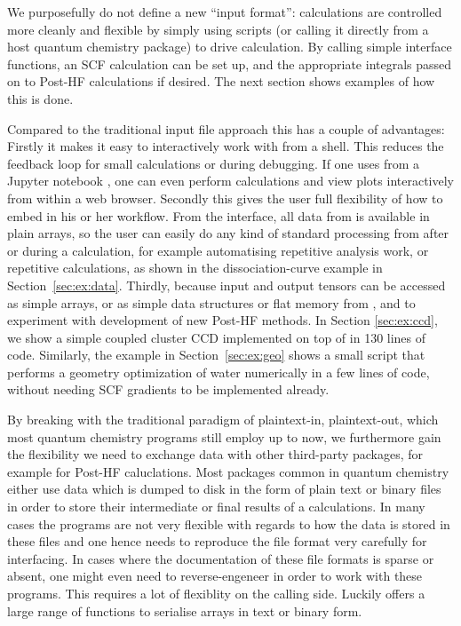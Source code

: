 We purposefully do not define a new ``input format'': calculations are 
controlled more cleanly and flexible by simply using
\python scripts (or calling it directly from a host quantum 
chemistry package) to drive calculation.
By calling simple interface functions, an SCF calculation can be set
up, and the appropriate integrals passed on to Post-HF calculations
if desired. The next section shows examples of how this is done.

Compared to the traditional input file approach this has
a couple of advantages:
%
Firstly it makes it easy to interactively work with \molsturm
from a shell. This reduces the feedback loop for small calculations
or during debugging.  If one uses \molsturm from a Jupyter notebook \cite{Jupyter},
one can even perform calculations and view plots interactively from within a web browser.
%
Secondly this gives the user full flexibility
of how to embed \molsturm in his or her workflow.
From the \python interface, all data from \molsturm is available
in plain \numpy arrays, so the user can easily do
any kind of standard processing from \python
after or during a calculation, for example
automatising repetitive analysis work, or repetitive calculations,
as shown in the dissociation-curve example in Section~\ref{sec:ex:data}.
%
Thirdly, because input and output tensors can be accessed as simple
\numpy arrays, or as simple data structures or flat memory from \cpp,
and to experiment with development of new Post-HF methods.
In Section \ref{sec:ex:ccd}, we show a simple coupled cluster CCD
implemented on top of \molsturm in 130 lines of \numpy code.
Similarly, the example in Section~\ref{sec:ex:geo} shows a small
\python script that performs a geometry optimization of water 
numerically in a few lines of code, without needing SCF gradients 
to be implemented already.

By breaking with the traditional paradigm of plaintext-in, plaintext-out,
which most quantum chemistry programs still employ up to now,
we furthermore gain the flexibility we need to exchange data with
other third-party packages, for example for Post-HF caluclations.
Most packages common in quantum chemistry either use data which is
dumped to disk in the form of plain text or binary files
in order to store their intermediate or final results of
a calculations.
In many cases the programs are not very flexible with regards to
how the data is stored in these files and one hence needs to reproduce
the file format very carefully for interfacing.
In cases where the documentation of these file formats is sparse
or absent,
one might even need to reverse-engeneer in order to work with these programs.
This requires a lot of flexiblity on the calling side.
Luckily \python offers a large range of functions to serialise \numpy
arrays in text or binary form.

